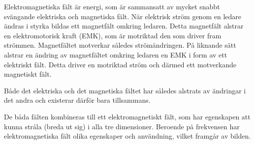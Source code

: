 Elektromagnetiska fält är energi, som är sammansatt av mycket snabbt svängande
elektriska och magnetiska fält.
När elektrisk ström genom en ledare ändras i styrka bildas ett magnetfält
omkring ledaren.
Detta magnetfält alstrar en elektromotorisk kraft (EMK), som är motriktad den
som driver fram strömmen.
Magnetfältet motverkar således strömändringen.
På liknande sätt alstrar en ändring av magnetfältet omkring ledaren en EMK i
form av ett elektriskt fält.
Detta driver en motriktad ström och därmed ett motverkande magnetiskt fält.

Både det elektriska och det magnetiska fältet har således alstrats av ändringar
i det andra och existerar därför bara tillsammans.

De båda fälten kombineras till ett elektromagnetiskt fält, som har egenskapen
att kunna stråla (breda ut sig) i alla tre dimensioner.
Beroende på frekvensen har elektromagnetiska fält olika egenskaper och
användning, vilket framgår av bilden.

